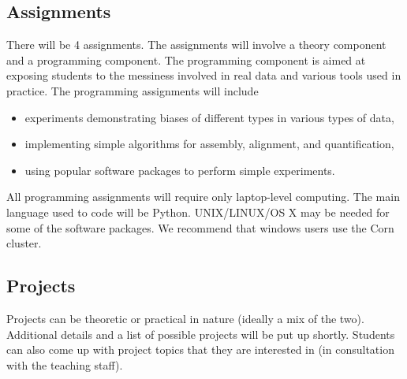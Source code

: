 \documentclass[11pt,onecolumn]{article}
\begin{document}
\subsection*{Assignments}
There will be 4 assignments. The assignments will involve a theory component and a programming component. The programming component is aimed at exposing students to the messiness involved in real data and various tools used in practice. The programming assignments will include
\begin{itemize}
	\itemsep0em
	\item experiments demonstrating biases of different types in various types of data,
	\item implementing simple algorithms for assembly, alignment, and quantification,
	\item using popular software packages to perform simple experiments. 
\end{itemize}
All programming assignments will require only laptop-level computing. The main language used to code will be Python. UNIX/LINUX/OS X may be needed for some of the software packages. We recommend that windows users use the Corn cluster. 

\subsection*{Projects}
Projects can be theoretic or practical in nature (ideally a mix of the two). Additional details and a list of possible projects will be put up shortly. Students can also come up with project topics that they are interested in (in consultation with the teaching staff). \\
\end{document}
